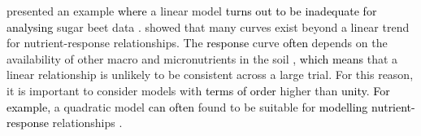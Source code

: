 \documentclass[a4paper]{article} 	%
\newcommand{\Matern}{Mat\'ern }
\newcommand{\AR}{\mathrm{AR1}}
\newcommand{\revision}[1]{\textcolor{black}{#1}}
\begin{document}
\textcite{Piepho2018Tutorial} presented an example \revision{where} a linear model \revision{turns out to be inadequate} \revision{for analysing} sugar beet data \parencite{Petersen1994Agricultural}. \textcite{Glynn2007} showed that many curves exist beyond a linear trend for nutrient-response relationships. The \revision{response} curve \revision{often} depends on the availability of other macro and micronutrients in the soil \parencite{Marschner2011}, \revision{which means } that a linear relationship is unlikely to be consistent across a large trial. For this reason, it is important to consider models with \revision{terms of order} higher than \revision{unity}. \revision{For example,} a quadratic model \revision{can often} found to be suitable for \revision{modelling nutrient-response} relationships \parencite{Piepho2018Tutorial, Liben2019}. 



% 



\end{document}
